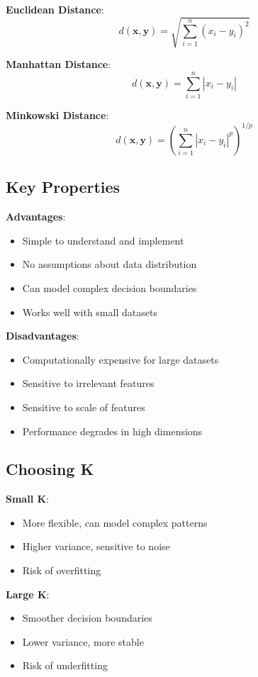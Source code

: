 \documentclass{article}
\begin{document}
\textbf{Euclidean Distance}:
$$d(\mathbf{x}, \mathbf{y}) = \sqrt{\sum_{i=1}^n (x_i - y_i)^2}$$

\textbf{Manhattan Distance}:
$$d(\mathbf{x}, \mathbf{y}) = \sum_{i=1}^n |x_i - y_i|$$

\textbf{Minkowski Distance}:
$$d(\mathbf{x}, \mathbf{y}) = \left(\sum_{i=1}^n |x_i - y_i|^p\right)^{1/p}$$

\subsection{Key Properties}

\textbf{Advantages}:
\begin{itemize}
    \item Simple to understand and implement
    \item No assumptions about data distribution
    \item Can model complex decision boundaries
    \item Works well with small datasets
\end{itemize}

\textbf{Disadvantages}:
\begin{itemize}
    \item Computationally expensive for large datasets
    \item Sensitive to irrelevant features
    \item Sensitive to scale of features
    \item Performance degrades in high dimensions
\end{itemize}

\subsection{Choosing K}

\textbf{Small K}: 
\begin{itemize}
    \item More flexible, can model complex patterns
    \item Higher variance, sensitive to noise
    \item Risk of overfitting
\end{itemize}

\textbf{Large K}:
\begin{itemize}
    \item Smoother decision boundaries
    \item Lower variance, more stable
    \item Risk of underfitting
\end{itemize}
\end{document}
